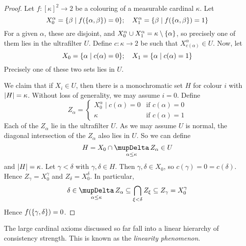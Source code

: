 \begin{proof}
    Let \( f : [\kappa]^2 \to 2 \) be a colouring of a measurable cardinal \( \kappa \).
    Let
    \[ X_0^\alpha = \qty{\beta \mid f(\qty{\alpha, \beta}) = 0};\quad X_1^\alpha = \qty{\beta \mid f(\qty{\alpha, \beta}) = 1} \]
    For a given \( \alpha \), these are disjoint, and \( X_0^\alpha \cup X_1^\alpha = \kappa \setminus \qty{\alpha} \), so precisely one of them lies in the ultrafilter \( U \).
    Define \( c : \kappa \to 2 \) be such that \( X_{c(\alpha)}^\alpha \in U \).
    Now, let
    \[ X_0 = \qty{\alpha \mid c(\alpha) = 0};\quad X_1 = \qty{\alpha \mid c(\alpha) = 1} \]
    Precisely one of these two sets lies in \( U \).

    We claim that if \( X_i \in U \), then there is a monochromatic set \( H \) for colour \( i \) with \( \abs{H} = \kappa \).
    Without loss of generality, we may assume \( i = 0 \).
    Define
    \[ Z_\alpha = \begin{cases}
        X^\alpha_0 \mid c(\alpha) = 0 & \text{if } c(\alpha) = 0 \\
        \kappa & \text{if } c(\alpha) = 1
    \end{cases} \]
    Each of the \( Z_\alpha \) lie in the ultrafilter \( U \).
    As we may assume \( U \) is normal, the diagonal intersection of the \( Z_\alpha \) also lies in \( U \).
    So we can define
    \[ H = X_0 \cap \operatorname*{\scalerel*{\mupDelta}{\textstyle\sum}}_{\alpha \leq \kappa} Z_\alpha \in U \]
    and \( \abs{H} = \kappa \).
    Let \( \gamma < \delta \) with \( \gamma, \delta \in H \).
    Then \( \gamma, \delta \in X_0 \), so \( c(\gamma) = 0 = c(\delta) \).
    Hence \( Z_\gamma = X^\gamma_0 \) and \( Z_\delta = X^\delta_0 \).
    In particular,
    \[ \delta \in \operatorname*{\scalerel*{\mupDelta}{\textstyle\sum}}_{\alpha \leq \kappa} Z_\alpha \subseteq \bigcap_{\xi < \delta} Z_\xi \subseteq Z_\gamma = X^\gamma_0 \]
    Hence \( f(\qty{\gamma,\delta}) = 0 \).
\end{proof}
The large cardinal axioms discussed so far fall into a linear hierarchy of consistency strength.
This is known as the \emph{linearity phenomenon}.

